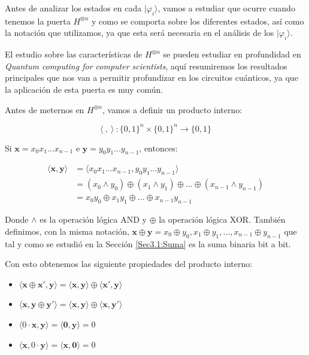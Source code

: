  Antes de analizar los estados en cada $|\varphi_{i}\rangle$, vamos a estudiar que ocurre cuando tenemos la puerta $H^{\otimes n}$ y como se comporta sobre los diferentes estados, así como la notación que utilizamos, ya que esta será necesaria en el análisis de los $|\varphi_{i}\rangle$. \newline

 El estudio sobre las características de $H^{\otimes n}$ se pueden estudiar en profundidad en \textit{Quantum computing for computer scientists}\cite{B:QuantumScientist:2008}, aquí resumiremos los resultados principales que nos van a permitir profundizar en los circuitos cuánticos, ya que la aplicación de esta puerta es muy común.\newline

 Antes de meternos en $H^{\otimes n}$, vamos a definir un producto interno:

 \begin{equation*}
     \langle\:,\:\rangle\::\{0,1\}^{n} \times \{0,1\}^{n} \rightarrow \{0,1\}\end{equation*}

 Si $\mathbf{x}=x_{0}x_{1}...x_{n-1}$ e $\mathbf{y}=y_{0}y_{1}...y_{n-1}$, entonces:

 \begin{equation}
     \begin{split}
     \langle\mathbf{x},\mathbf{y}\rangle &= \langle x_{0}x_{1}...x_{n-1},y_{0}y_{1}...y_{n-1}\rangle \\ &= (x_{0}\land y_{0})\oplus(x_{1}\land y_{1})\oplus...\oplus(x_{n-1}\land y_{n-1}) \\ &= x_{0}y_{0}\oplus x_{1}y_{1}\oplus ... \oplus x_{n-1}y_{n-1}
     \end{split}
 \end{equation}

 Donde $\land$ es la operación lógica AND y $\oplus$ la operación lógica XOR. También definimos, con la misma notación,  $\mathbf{x}\oplus\mathbf{y}=x_{0}\oplus y_{0},x_{1}\oplus y_{1},...,x_{n-1}\oplus y_{n-1}$ que tal y como se estudió en la Sección \ref{Sec3.1:Suma} es la suma binaria bit a bit.\newline

 Con esto obtenemos las siguiente propiedades del producto interno:

 \begin{itemize}
     \item $\langle \mathbf{x} \oplus \mathbf{x}',\mathbf{y}\rangle=\langle \mathbf{x},\mathbf{y}\rangle \oplus \langle \mathbf{x}',\mathbf{y}\rangle$

     \item $\langle \mathbf{x},\mathbf{y} \oplus \mathbf{y}'\rangle=\langle \mathbf{x},\mathbf{y}\rangle \oplus \langle \mathbf{x},\mathbf{y}'\rangle$

     \item $\langle 0\cdot \mathbf{x},\mathbf{y}\rangle=\langle\mathbf{0},\mathbf{y}\rangle=0$

     \item $\langle \mathbf{x}, 0 \cdot \mathbf{y}\rangle=\langle \mathbf{x},\mathbf{0}\rangle=0$
 \end{itemize}

